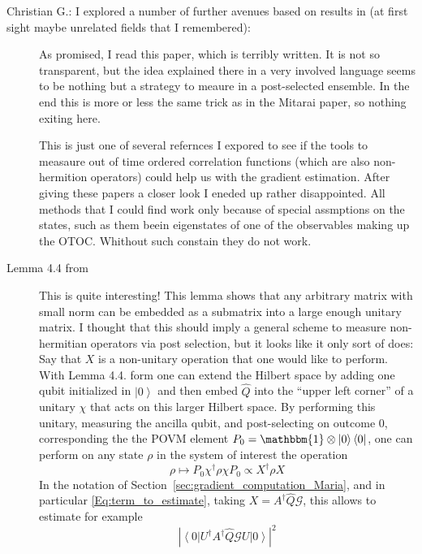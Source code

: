 \documentclass[aps,pra,10pt,twocolumn,groupedaddress,nofootinbib]{revtex4-1}
\theoremstyle{plain}
\newcommand{\I}{\mathbbm{1}} %
\newcommand{\ket}[1]{\ensuremath{\left| #1 \right \rangle}}
\newcommand{\bra}[1]{\ensuremath{\left \langle #1 \right |}}
\newcommand{\ketbra}[2]{\ket{#1}\bra{#2}}
\newcommand{\G}{\mathcal{G}}
\newcommand{\cg}[1]{\textcolor{cyan!80!black}{Christian G.: #1}}
\begin{document}
\cg{I explored a number of further avenues based on results in (at first sight maybe unrelated fields that I remembered):}
\begin{description}
\item [\cite{Pati2015}] As promised, I read this paper, which is terribly written. It is not so transparent, but the idea explained there in a very involved language seems to be nothing but a strategy to meaure in a post-selected ensemble. In the end this is more or less the same trick as in the Mitarai paper, so nothing exiting here. 
\item [\cite{Garttner2017}] This is just one of several refernces I expored to see if the tools to measaure out of time ordered correlation functions (which are also non-hermition operators) could help us with the gradient estimation. After giving these papers a closer look I eneded up rather disappointed. All methods that I could find work only because of special assmptions on the states, such as them beein eigenstates of one of the observables making up the OTOC. Whithout such constain they do not work. 
\item [Lemma 4.4 from \cite{Aaronson2011}]
  This is quite interesting! This lemma shows that any arbitrary matrix with small norm can be embedded as a submatrix into a large enough unitary matrix.
  I thought that this should imply a general scheme to measure non-hermitian operators via post selection, but it looks like it only sort of does:
  Say that $X$ is a non-unitary operation that one would like to perform.
  With Lemma 4.4. form \cite{Aaronson2011} one can extend the Hilbert space by adding one qubit initialized in $\ket{0}$ and then embed $\hat{Q}$ into the ``upper left corner'' of a unitary $\chi$ that acts on this larger Hilbert space.
  By performing this unitary, measuring the ancilla qubit, and post-selecting on outcome $0$, corresponding the the POVM element $P_0 = \I \otimes \ketbra{0}{0}$, one can perform on any state $\rho$ in the system of interest the operation
  \begin{equation}
    \rho \mapsto  P_0 \chi^\dagger \rho \chi P_0  \propto  X^\dagger \rho X
  \end{equation} 
  In the notation of Section~\ref{sec:gradient_computation_Maria}, and in particular \eqref{Eq:term_to_estimate}, taking $X = A^{\dagger}  \hat{Q} \G$, this allows to estimate for example
  \begin{equation}
    |\bra{0} U^\dagger A^{\dagger}  \hat{Q} \G U \ket{0}|^2
  \end{equation}

\end{description}
\end{document}
